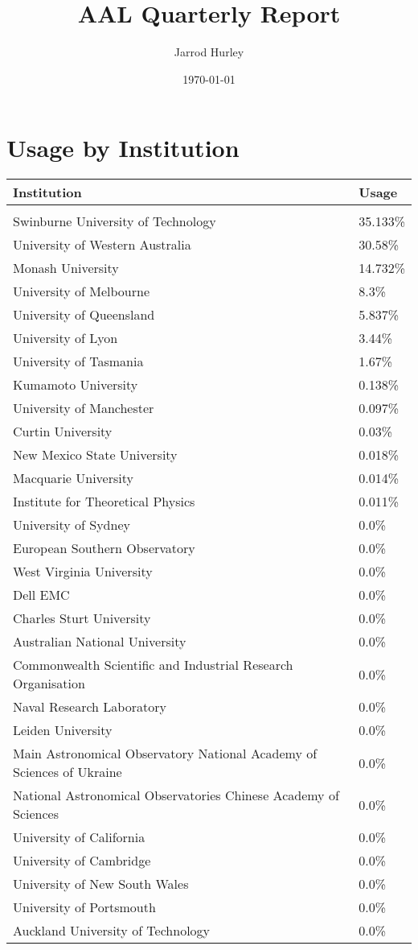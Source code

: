\documentclass{article}%
\title{AAL Quarterly Report}%
\author{Jarrod Hurley}%
\date{\today}%
\begin{document}
%
\normalsize%
\maketitle%
\newpage%
\section{Usage by Institution }%

%
\begin{longtabu}{X[l] X[r]}%
\textbf{Institution}&\textbf{Usage}\\%
\hline%
&\\%
Swinburne University of Technology&35.133\%\\%
\hline%
University of Western Australia&30.58\%\\%
\hline%
Monash University&14.732\%\\%
\hline%
University of Melbourne&8.3\%\\%
\hline%
University of Queensland&5.837\%\\%
\hline%
University of Lyon&3.44\%\\%
\hline%
University of Tasmania&1.67\%\\%
\hline%
Kumamoto University&0.138\%\\%
\hline%
University of Manchester&0.097\%\\%
\hline%
Curtin University&0.03\%\\%
\hline%
New Mexico State University&0.018\%\\%
\hline%
Macquarie University&0.014\%\\%
\hline%
Institute for Theoretical Physics&0.011\%\\%
\hline%
University of Sydney&0.0\%\\%
\hline%
European Southern Observatory&0.0\%\\%
\hline%
West Virginia University&0.0\%\\%
\hline%
Dell EMC&0.0\%\\%
\hline%
Charles Sturt University&0.0\%\\%
\hline%
Australian National University&0.0\%\\%
\hline%
Commonwealth Scientific and Industrial Research Organisation&0.0\%\\%
\hline%
Naval Research Laboratory&0.0\%\\%
\hline%
Leiden University&0.0\%\\%
\hline%
Main Astronomical Observatory National Academy of Sciences of Ukraine&0.0\%\\%
\hline%
National Astronomical Observatories Chinese Academy of Sciences&0.0\%\\%
\hline%
University of California&0.0\%\\%
\hline%
University of Cambridge&0.0\%\\%
\hline%
University of New South Wales&0.0\%\\%
\hline%
University of Portsmouth&0.0\%\\%
\hline%
Auckland University of Technology&0.0\%\\%
\hline%
\end{longtabu}%
\end{document}

